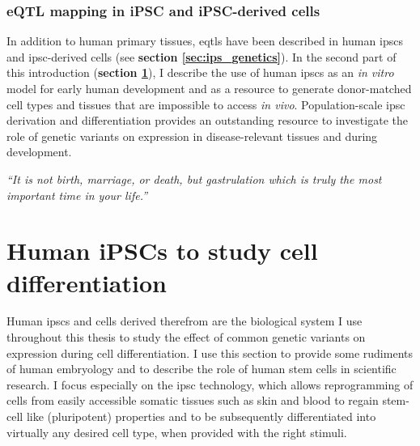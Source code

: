 \subsubsection{eQTL mapping in iPSC and iPSC-derived cells}

In addition to human primary tissues, \glspl{eqtl} have been described in human \glspl{ipsc} and \gls{ipsc}-derived cells (see \textbf{section \ref{sec:ips_genetics}}).
In the second part of this introduction (\textbf{section \ref{sec:human_ipscs}}), I describe the use of human \glspl{ipsc} as an \textit{in vitro} model for early human development and as a resource to generate donor-matched cell types and tissues that are impossible to access \textit{in vivo}.
Population-scale \gls{ipsc} derivation and differentiation provides an outstanding resource to investigate the role of genetic variants on expression in disease-relevant tissues and during development.



\newpage

\vspace*{10px}

\textit{“It is not birth, marriage, or death, but gastrulation which is truly the most important time in your life.”}\\

\vspace*{5px}


\section{Human iPSCs to study cell differentiation}  %
\label{sec:human_ipscs}  

Human \glspl{ipsc} and cells derived therefrom are the biological system I use throughout this thesis to study the effect of common genetic variants on expression during cell differentiation.
I use this section to provide some rudiments of human embryology and to describe the role of human stem cells in scientific research.
I focus especially on the \gls{ipsc} technology, which allows reprogramming of cells from easily accessible somatic tissues such as skin and blood to regain stem-cell like (pluripotent) properties and to be subsequently differentiated into virtually any desired cell type, when provided with the right stimuli.\\

